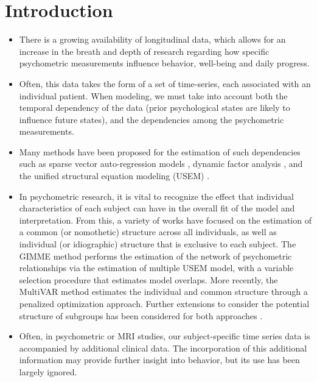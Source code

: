 

\section{Introduction}


\begin{itemize}
	\item There is a growing availability of longitudinal data, which allows for an increase in the breath and depth of research regarding how specific psychometric measurements influence behavior, well-being and daily progress.
	
	\item Often, this data takes the form of a set of time-series, each associated with an individual patient. When modeling, we must take into account both the temporal dependency of the data (prior psychological states are likely to influence future states), and the dependencies among the psychometric measurements.
	
	\item Many methods have been proposed for the estimation of such dependencies such as sparse vector auto-regression models \citep{basu2015regularized}, dynamic factor analysis \citep{stock2002forecasting}, and the unified structural equation modeling (USEM) \citep{kim2007unified}.
	
	\item In psychometric research, it is vital to recognize the effect that individual characteristics of each subject can have in the overall fit of the model and interpretation. From this, a variety of works have focused on the estimation of a common (or nomothetic) structure across all individuals, as well as individual (or idiographic) structure that is exclusive to each subject. The GIMME method \citep{gates2012group} performs the estimation of the network of psychometric relationships via the estimation of multiple USEM model, with a variable selection procedure that estimates model overlaps. More recently, the MultiVAR method \citep{fisher2022penalized} estimates the individual and common structure through a penalized optimization approach. Further extensions to consider the potential structure of subgroups has been considered for both approaches \citep{lane2019uncovering,crawford2024penalized}.
	
	
	\item Often, in psychometric or MRI studies, our subject-specific time series data is accompanied by additional clinical data. The incorporation of this additional information may provide further insight into behavior, but its use has been largely ignored.
	

\end{itemize}
